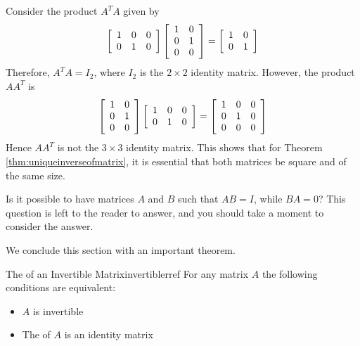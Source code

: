 \begin{solution}
Consider the product $A^{T}A$ given by 
\begin{equation*}
\left[
\begin{array}{rrr}
1 & 0 & 0\\
0 & 1 & 0
\end{array}
\right]
\left[
\begin{array}{rr}
1 & 0 \\
0 & 1 \\
0 & 0 
\end{array}
\right]
=
\left[
\begin{array}{rr}
1 & 0 \\
0 & 1
\end{array}
\right]
\end{equation*}
Therefore, $A^{T}A = I_2$, where $I_2$ is the $2 \times 2$ identity matrix.
However, the product $AA^{T}$ is 
\begin{equation*}
\left[
\begin{array}{rr}
1 & 0 \\
0 & 1 \\
0 & 0 
\end{array}
\right]
\left[
\begin{array}{rrr}
1 & 0 & 0\\
0 & 1 & 0
\end{array}
\right]
=
\left[
\begin{array}{rrr}
1 & 0 & 0 \\
0 & 1 & 0 \\
0 & 0 & 0
\end{array}
\right]
\end{equation*}
Hence $AA^{T}$ is not the $3 \times 3$ identity matrix. This shows that for Theorem \ref{thm:uniqueinverseofmatrix}, it is essential that both matrices be square and of the same size.
\end{solution}

Is it possible to have matrices $A$ and $B$ such that $AB=I$, while $BA=0$? This question is left to the reader to answer, and you should take a moment to consider the answer.

We conclude this section with an important theorem.

\begin{theorem}{The {\RREF} of an Invertible Matrix}{invertiblerref}
For any matrix $A$ the following conditions are equivalent:
\begin{itemize}
\item $A$ is invertible
\item The {\rref} of $A$ is an identity matrix
\end{itemize}
\end{theorem}

